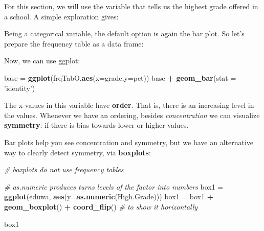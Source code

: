 \documentclass[]{article}
\newenvironment{Shaded}{\begin{snugshade}}{\end{snugshade}}
\newcommand{\KeywordTok}[1]{\textcolor[rgb]{0.13,0.29,0.53}{\textbf{#1}}}
\newcommand{\DataTypeTok}[1]{\textcolor[rgb]{0.13,0.29,0.53}{#1}}
\newcommand{\StringTok}[1]{\textcolor[rgb]{0.31,0.60,0.02}{#1}}
\newcommand{\CommentTok}[1]{\textcolor[rgb]{0.56,0.35,0.01}{\textit{#1}}}
\newcommand{\OperatorTok}[1]{\textcolor[rgb]{0.81,0.36,0.00}{\textbf{#1}}}
\newcommand{\NormalTok}[1]{#1}
\begin{document}
For this section, we will use the variable that tells us the highest
grade offered in a school. A simple exploration gives:

\begin{Shaded}
\end{Shaded}

Being a categorical variable, the default option is again the bar plot.
So let's prepare the frequency table as a data frame:

\begin{Shaded}
\end{Shaded}

Now, we can use ggplot:

\begin{Shaded}
\begin{Highlighting}[]
\NormalTok{base =}\StringTok{ }\KeywordTok{ggplot}\NormalTok{(frqTabO,}\KeywordTok{aes}\NormalTok{(}\DataTypeTok{x=}\NormalTok{grade,}\DataTypeTok{y=}\NormalTok{pct))}
\NormalTok{base }\OperatorTok{+}\StringTok{ }\KeywordTok{geom_bar}\NormalTok{(}\DataTypeTok{stat =} \StringTok{'identity'}\NormalTok{) }
\end{Highlighting}
\end{Shaded}

The x-values in this variable have \textbf{order}. That is, there is an
increasing level in the values. Whenever we have an ordering, besides
\emph{concentration} we can visualize \textbf{symmetry}: if there is
bias towards lower or higher values.

Bar plots help you see concentration and symmetry, but we have an
alternative way to clearly detect symmetry, via \textbf{boxplots}:

\begin{Shaded}
\begin{Highlighting}[]
\CommentTok{# boxplots do not use frequency tables}

\CommentTok{# as.numeric produces turns levels of the factor into numbers}
\NormalTok{box1 =}\StringTok{ }\KeywordTok{ggplot}\NormalTok{(eduwa, }\KeywordTok{aes}\NormalTok{(}\DataTypeTok{y=}\KeywordTok{as.numeric}\NormalTok{(High.Grade))) }
\NormalTok{box1 =}\StringTok{ }\NormalTok{box1 }\OperatorTok{+}\StringTok{ }\KeywordTok{geom_boxplot}\NormalTok{() }\OperatorTok{+}\StringTok{ }\KeywordTok{coord_flip}\NormalTok{() }\CommentTok{# to show it horizontally}

\NormalTok{box1}
\end{Highlighting}
\end{Shaded}
\end{document}

